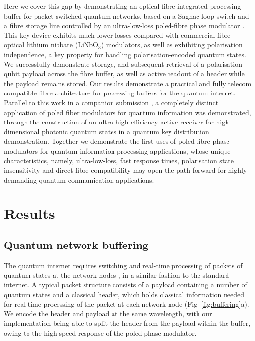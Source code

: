 \documentclass[%
reprint,
superscriptaddress,
 amsmath,amssymb,
 aps,
 prx,
floatfix,
]{revtex4-2}
\begin{document}
Here we cover this gap by demonstrating an optical-fibre-integrated processing buffer for packet-switched quantum networks, based on a Sagnac-loop switch \cite{alarcon2020sagnacswitch} and a fibre storage line controlled by an ultra-low-loss poled-fibre phase modulator \cite{myers1991poledsilica,kazansky1997poling,fujiwara1995uvpoling,fokine2002mzswitch, Spegel-Lexne2025}. This key device exhibits much lower losses compared with commercial fibre-optical lithium niobate (LiNbO$_3$) modulators, as well as exhibiting polarisation independence, a key property for handling polarisation-encoded quantum states.  We successfully demonstrate storage, and subsequent retrieval of a polarisation qubit payload across the fibre buffer, as well as active readout of a header while the payload remains stored. Our results demonstrate a practical and fully telecom compatible fibre architecture for processing buffers for the quantum internet. Parallel to this work in a companion submission \cite{Guerrero2026}, a completely distinct application of poled fiber modulators for quantum information was demonstrated, through the construction of an ultra-high efficiency active receiver for high-dimensional photonic quantum states in a quantum key distribution demonstration. Together we demonstrate the first uses of poled fibre phase modulators for quantum information processing applications, whose unique characteristics, namely, ultra-low-loss, fast response times, polarisation state insensitivity and direct fibre compatibility may open the path forward for highly demanding quantum communication applications. 

\section*{Results}

\subsection*{Quantum network buffering}

The quantum internet requires switching and real-time processing of packets of quantum states at the network nodes \cite{DiAdamo2022, Mandil2023, Yoo2024}, in a similar fashion to the standard internet. A typical packet structure consists of a payload containing a number of quantum states and a classical header, which holds classical information needed for real-time processing of the packet at each network node (Fig. \ref{fig:buffering}a). We encode the header and payload at the same wavelength, with our implementation being able to split the header from the payload within the buffer, owing to the high-speed response of the poled phase modulator.
\end{document}
